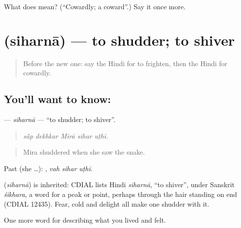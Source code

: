 \begin{tcolorbox}[breakable,colback=teal!4,colframe=teal!35!black,title={Before you move on}]
What does  mean? (\textquotedblleft{}Cowardly; a coward\textquotedblright{}.) Say it once more.
\end{tcolorbox}
\section[\texorpdfstring{\hi{सिहरना} (siharnā)}{सिहरना (siharnā)}]{ (siharnā) — to shudder; to shiver}

\label{lesson:HI-C457-siharna}



\begin{quote}
Before the new one: say the Hindi for to frighten, then the Hindi for cowardly.
\end{quote}

\subsection*{You'll want to know: }
\textbf{} — \emph{siharnā} — \textquotedblleft{}to shudder; to shiver\textquotedblright{}.

\begin{quote}
    
\end{quote}

\begin{quote}
\emph{sā̃p dekhkar Mīrā sihar uṭhī.}
\end{quote}

\begin{quote}
Mira shuddered when she saw the snake.
\end{quote}

Past (she …):   , \emph{vah sihar uṭhī}.

\begin{cousinweb}
\textbf{} (\emph{siharnā}) is inherited: CDIAL lists Hindi \emph{siharnā}, \textquotedblleft{}to shiver\textquotedblright{}, under Sanskrit \emph{śikhara}, a word for a peak or point, perhaps through the hair standing on end (CDIAL 12435). Fear, cold and delight all make one shudder with it.
\end{cousinweb}

\begin{grammarlens}[title={What you've built}]
One more word for describing what you lived and felt.
\end{grammarlens}

